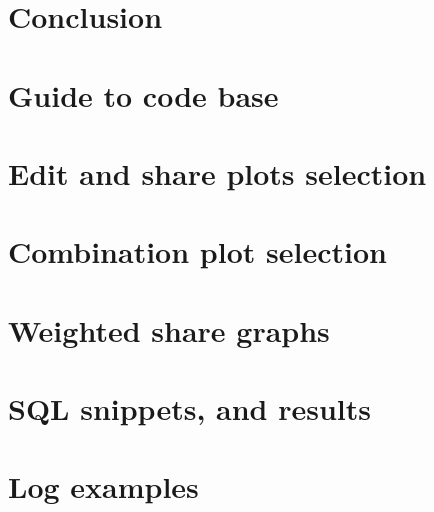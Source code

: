 \documentclass[a4paper,11pt,twoside]{report}
\begin{document}
\chapter{Conclusion}
\label{ch:conclusions}





{}
\printbibliography    

\appendix

\begin{appendices}
\chapter{Guide to code base}
\label{sec:dirtree}

\chapter{Edit and share plots selection}
\label{sec:edit-share}

\chapter{Combination plot selection}

\label{sec:traj-article-talk}
\chapter{Weighted share graphs}

\label{sec:LudvigFadeev}
\chapter{SQL snippets, and results}
\label{sec:sql-things}

\chapter{Log examples}
\label{sec:appendix-debug}

\end{appendices}
\end{document}

